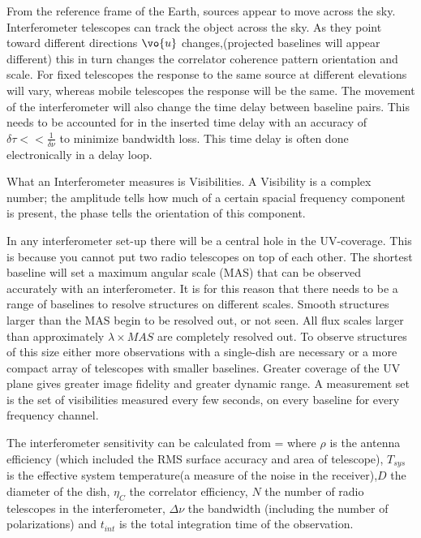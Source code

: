 From the reference frame of the Earth, sources appear to move across the sky.
Interferometer telescopes can track the object across the sky.
As they point toward different directions $\vo{u}$ changes,(projected baselines will appear different) this in turn changes the correlator coherence pattern orientation and scale.
For fixed telescopes the response to the same source at different elevations will vary, whereas mobile telescopes the response will be the same.
The movement of the interferometer will also change the time delay between baseline pairs.
This needs to be accounted for in the inserted time delay with an accuracy of $\delta \tau << \frac{1}{\delta \nu}$ to minimize bandwidth loss.
This time delay is often done electronically in a delay loop.


What an Interferometer measures is Visibilities.
A Visibility is a complex number; the amplitude tells how much of a certain spacial frequency component is present, the phase tells the orientation of this component.

In any interferometer set-up there will be a central hole in the UV-coverage.
This is because you cannot put two radio telescopes on top of each other.
The shortest baseline will set a maximum angular scale (MAS) that can be observed accurately with an interferometer.
It is for this reason that there needs to be a range of baselines to resolve structures on different scales.
Smooth structures larger than the MAS begin to be resolved out, or not seen.
All flux scales larger than approximately $\lambda \times MAS$ are completely resolved out.
To observe structures of this size either more observations with a single-dish are necessary or a more compact array of telescopes with smaller baselines.
Greater coverage of the UV plane gives greater image fidelity and greater dynamic range.
A measurement set is the set of visibilities measured every few seconds, on every baseline for every frequency channel.

The interferometer sensitivity can be calculated from
\be
\sigma=
\ee
where $\rho$ is the antenna efficiency (which included the RMS surface accuracy and area of telescope), $T_{sys}$ is the effective system temperature(a measure of the noise in the receiver),$D$ the diameter of the dish, $\eta_C$ the correlator efficiency, $N$ the number of radio telescopes in the interferometer, $\Delta \nu$ the bandwidth (including the number of polarizations) and $t_{int}$ is the total integration time of the observation.


